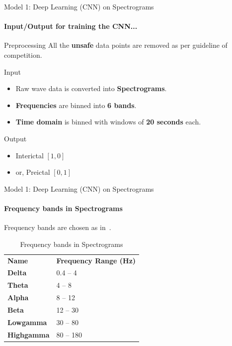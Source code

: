 \documentclass{beamer}
\begin{document}
\begin{frame}{Model 1: Deep Learning (CNN) on Spectrograms}
  \framesubtitle{Input/Output for training the CNN...}

  \begin{block}{Preprocessing}
    All the \textbf{unsafe} data points are removed as per guideline of
    competition.
  \end{block}
  
  \begin{block}{Input}
    \begin{itemize}
    \item Raw wave data is converted into \textbf{Spectrograms}.
    \item \textbf{Frequencies} are binned into \textbf{6 bands}.
    \item \textbf{Time domain} is binned with windows of \textbf{20 seconds} each.
    \end{itemize}
  \end{block}  

  \begin{block}{Output}
    \begin{itemize}
      \item Interictal $[1, 0]$
      \item or, Preictal   $[0, 1]$
    \end{itemize}
  \end{block}  

\end{frame}

\begin{frame}{Model 1: Deep Learning (CNN) on Spectrograms}
  \framesubtitle{Frequency bands in Spectrograms}

  Frequency bands are chosen as in~\cite{korshunova_faculty_2015}.
  
  \begin{block}{}
    \begin{table}[]
      \centering
      \caption{Frequency bands in Spectrograms}
      \begin{tabular}{ll}
        \textbf{Name}               & \textbf{Frequency Range (Hz)} \\
        \textbf{Delta}     & 0.4 -- 4                      \\
        \textbf{Theta}     & 4 -- 8                        \\
        \textbf{Alpha}     & 8 -- 12                       \\
        \textbf{Beta}      & 12 -- 30                      \\
        \textbf{Lowgamma}  & 30 -- 80                      \\
        \textbf{Highgamma} & 80 -- 180                    
      \end{tabular}
    \end{table}
  \end{block}

\end{frame}
\end{document}
